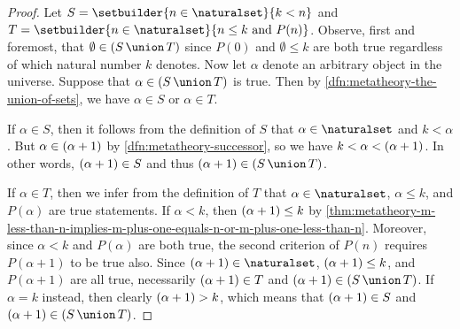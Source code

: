 \begin{proof}
    Let \( S = \setbuilder{n \in \naturalset}{k < n} \) and \( T = \setbuilder{n \in \naturalset}{n \leq k \ \text{and} \ P(n)} \).
    Observe, first and foremost, that \( \emptyset \in \mleft( S \,{\union}\, T \mright) \) since \( P(0) \) and \( \emptyset \leq k \) are both
    true regardless of which natural number \( k \) denotes.
    Now let \( \alpha \) denote an arbitrary object in the universe.
    Suppose that \( \alpha \in \mleft( S \,{\union}\, T \mright) \) is true.
    Then by \cref{dfn:metatheory-the-union-of-sets}, we have \( \alpha \in S \) or \( \alpha \in T \).

    \vspace{0.3cm}
    \noindent
    If \( \alpha \in S \), then it follows from the definition of \( S \) that \( \alpha \in \naturalset \) and \( k < \alpha \).
    But \( \alpha \in \mleft( \alpha + 1 \mright) \) by \cref{dfn:metatheory-successor}, so we have \( k < \alpha < \mleft( \alpha + 1 \mright)  \).
    In other words, \( \mleft( \alpha + 1 \mright) \in S  \) and thus \( \mleft( \alpha + 1 \mright) \in \mleft( S \,{\union}\, T \mright) \).

    \vspace{0.3cm}
    \noindent
    If \( \alpha \in T \), then we infer from the definition of \( T \) that \( \alpha \in \naturalset \), \( \alpha \leq k \), and \( P(\alpha) \) are true statements.
    If \( \alpha < k \), then \( \mleft( \alpha + 1 \mright) \leq k \) by \cref{thm:metatheory-m-less-than-n-implies-m-plus-one-equals-n-or-m-plus-one-less-than-n}.
    Moreover, since \( \alpha < k \) and \( P(\alpha) \) are both true, the second criterion of \( P(n) \) requires \( P(\alpha + 1) \) to be true also.
    Since \( \mleft( \alpha + 1 \mright) \in \naturalset \), \( \mleft( \alpha + 1 \mright) \leq k \), and \( P(\alpha + 1) \) are all true, necessarily
    \( \mleft( \alpha + 1 \mright) \in T \) and \( \mleft( \alpha + 1 \mright) \in \mleft( S \,{\union}\, T \mright) \).
    If \( \alpha = k \) instead, then clearly \( \mleft( \alpha + 1 \mright) > k \), which means that \( \mleft( \alpha + 1 \mright) \in S \) and
    \( \mleft( \alpha + 1 \mright) \in \mleft( S \,{\union}\, T \mright) \).


\end{proof}
